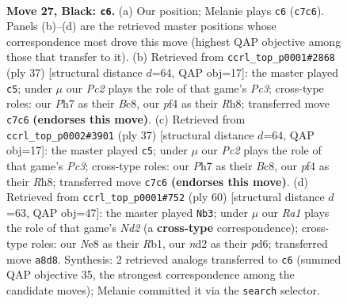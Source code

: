 \documentclass[11pt]{article}
\begin{document}
\clearpage

\begin{figure}[p]\centering
\begin{subfigure}{0.46\textwidth}\centering
\resizebox{\linewidth}{!}{%
\newchessgame
\chessboard[
  setfen={r3n1k1/P1p3bp/1p4p1/8/4BPpP/R7/3NR2K/2r5 b - - 0 27},
  showmover=false,
  pgfstyle=straightmove, color=movearrow, markmove={c7-c6}
]}
\caption{}
\end{subfigure}\hfill
\begin{subfigure}{0.46\textwidth}\centering
\resizebox{\linewidth}{!}{%
\newchessgame
\chessboard[
  setfen={r1b1k2r/5p2/1Pp1p3/p7/2Bn4/2N5/1P3PPP/R2K3R b kq - 0 19},
  showmover=false,
  pgfstyle=straightmove, color=movearrow, markmove={c6-c5}
]}
\caption{}
\end{subfigure}
\\[4pt]
\begin{subfigure}{0.46\textwidth}\centering
\resizebox{\linewidth}{!}{%
\newchessgame
\chessboard[
  setfen={r1b1k2r/5p2/1Pp1p3/p7/2Bn4/2N5/1P3PPP/R2K3R b kq - 0 19},
  showmover=false,
  pgfstyle=straightmove, color=movearrow, markmove={c6-c5}
]}
\caption{}
\end{subfigure}\hfill
\begin{subfigure}{0.46\textwidth}\centering
\resizebox{\linewidth}{!}{%
\newchessgame
\chessboard[
  setfen={1r2k3/2R3p1/3p3p/8/1b2P3/3p2P1/rP1N1P1P/1R4K1 w - - 2 31},
  showmover=false,
  pgfstyle=straightmove, color=movearrow, markmove={d2-b3}
]}
\caption{}
\end{subfigure}
\caption{\textbf{Move 27, Black: \texttt{c6}.} (a) Our position; Melanie plays \texttt{c6} (\texttt{c7c6}). Panels (b)--(d) are the retrieved master positions whose correspondence most drove this move (highest QAP objective among those that transfer to it). (b) Retrieved from \texttt{ccrl\_top\_p0001\#2868} (ply 37) [structural distance $d$=64, QAP obj=17]: the master played \texttt{c5}; under $\mu$ our \emph{Pc2} plays the role of that game's \emph{Pc3}; cross-type roles: our \emph{P}h7 as their \emph{B}c8, our \emph{p}f4 as their \emph{R}h8; transferred move \texttt{c7c6} \textbf{(endorses this move)}. (c) Retrieved from \texttt{ccrl\_top\_p0002\#3901} (ply 37) [structural distance $d$=64, QAP obj=17]: the master played \texttt{c5}; under $\mu$ our \emph{Pc2} plays the role of that game's \emph{Pc3}; cross-type roles: our \emph{P}h7 as their \emph{B}c8, our \emph{p}f4 as their \emph{R}h8; transferred move \texttt{c7c6} \textbf{(endorses this move)}. (d) Retrieved from \texttt{ccrl\_top\_p0001\#752} (ply 60) [structural distance $d$=63, QAP obj=47]: the master played \texttt{Nb3}; under $\mu$ our \emph{Ra1} plays the role of that game's \emph{Nd2} (a \textbf{cross-type} correspondence); cross-type roles: our \emph{N}e8 as their \emph{R}b1, our \emph{n}d2 as their \emph{p}d6; transferred move \texttt{a8d8}. Synthesis: 2 retrieved analogs transferred to \texttt{c6} (summed QAP objective 35, the strongest correspondence among the candidate moves); Melanie committed it via the \texttt{search} selector.}
\label{fig:thought-m53}
\end{figure}
\end{document}
